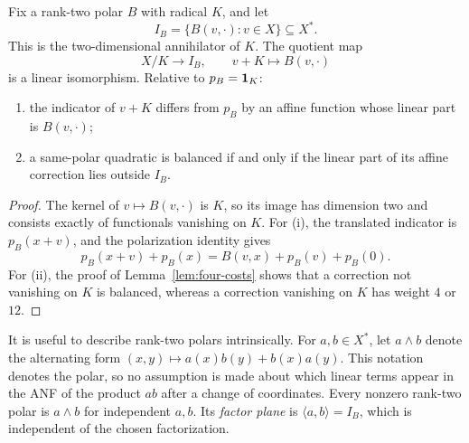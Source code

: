 \begin{lemma}\label{lem:offsets}
Fix a rank-two polar $B$ with radical $K$, and let
\[
I_B=\{B(v,\cdot):v\in X\}\subseteq X^*.
\]
This is the two-dimensional annihilator of $K$. The quotient map
\[
X/K\longrightarrow I_B,\qquad v+K\longmapsto B(v,\cdot)
\]
is a linear isomorphism. Relative to $p_B=\mathbf 1_K$:
\begin{enumerate}[label=(\roman*)]
\item the indicator of $v+K$ differs from $p_B$ by an affine function whose linear part is $B(v,\cdot)$;
\item a same-polar quadratic is balanced if and only if the linear part of its affine correction lies outside $I_B$.
\end{enumerate}
\end{lemma}
\begin{proof}
The kernel of $v\mapsto B(v,\cdot)$ is $K$, so its image has dimension two and consists exactly of functionals vanishing on $K$. For (i), the translated indicator is $p_B(x+v)$, and the polarization identity gives
\[
p_B(x+v)+p_B(x)=B(v,x)+p_B(v)+p_B(0).
\]
For (ii), the proof of Lemma~\ref{lem:four-costs} shows that a correction not vanishing on $K$ is balanced, whereas a correction vanishing on $K$ has weight $4$ or $12$.
\end{proof}

It is useful to describe rank-two polars intrinsically. For $a,b\in X^*$, let $a\wedge b$ denote the alternating form $(x,y)\mapsto a(x)b(y)+b(x)a(y)$. This notation denotes the polar, so no assumption is made about which linear terms appear in the ANF of the product $ab$ after a change of coordinates. Every nonzero rank-two polar is $a\wedge b$ for independent $a,b$. Its \emph{factor plane} is $\langle a,b\rangle=I_B$, which is independent of the chosen factorization.

